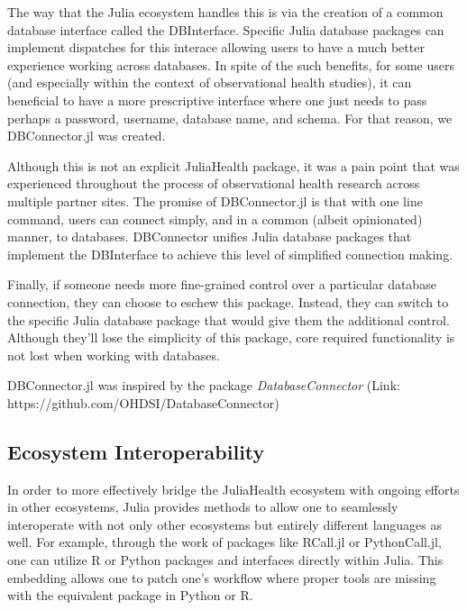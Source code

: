 \documentclass{juliacon}
\begin{document}
The way that the Julia ecosystem handles this is via the creation of a common database interface called the DBInterface.
Specific Julia database packages can implement dispatches for this interace allowing users to have a much better experience working across databases.
In spite of the such benefits, for some users (and especially within the context of observational health studies), it can beneficial to have a more prescriptive interface where one just needs to pass perhaps a password, username, database name, and schema.
For that reason, we DBConnector.jl was created.

Although this is not an explicit JuliaHealth package, it was a pain point that was experienced throughout the process of observational health research across multiple partner sites.
The promise of DBConnector.jl is that with one line command, users can connect simply, and in a common (albeit opinionated) manner, to databases.
DBConnector unifies Julia database packages that implement the DBInterface to achieve this level of simplified connection making.

Finally, if someone needs more fine-grained control over a particular database connection, they can choose to eschew this package.
Instead, they can switch to the specific Julia database package that would give them the additional control.
Although they'll lose the simplicity of this package, core required functionality is not lost when working with databases.

DBConnector.jl was inspired by the package \textit{DatabaseConnector} (Link: https://github.com/OHDSI/DatabaseConnector)


\subsection{Ecosystem Interoperability}

In order to more effectively bridge the JuliaHealth ecosystem with ongoing efforts in other ecosystems, Julia provides methods to allow one to seamlessly interoperate with not only other ecosystems but entirely different languages as well.
For example, through the work of packages like RCall.jl or PythonCall.jl, one can utilize R or Python packages and interfaces directly within Julia. \cite{PythonCall.jl} \cite{RCallJl}
This embedding allows one to patch one's workflow where proper tools are missing with the equivalent package in Python or R.
\end{document}
